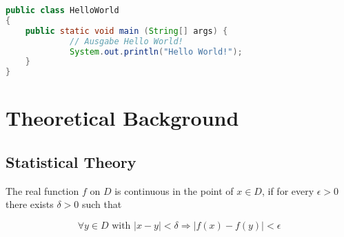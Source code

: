 \documentclass{article}
\begin{document}
\begin{lstlisting}[language=Java,frame=single] 
public class HelloWorld
{
	public static void main (String[] args) {
             // Ausgabe Hello World!
             System.out.println("Hello World!");
	} 
}
\end{lstlisting}


\section{Theoretical Background}
\subsection{Statistical Theory}

The real function $f$ on $D$ is continuous in the point of $x \in D$, if for every $\epsilon  \textrm{}>  0 $  there exists $\delta > 0$ such that 

\begin{equation}
   \forall y \in D \textrm{ with } \vert x - y  \vert < \delta \Rightarrow \vert f(x) - f(y) \vert < \textrm{} \epsilon
   \label{eq:equ}
\end{equation} 




%
\listoffigures

\end{document}
